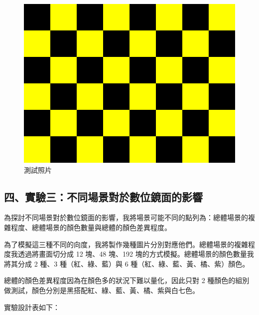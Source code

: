 \documentclass[12pt]{article}
\begin{document}
\begin{figure}[htbp]
\begin{minipage}[b]{0.3\textwidth}
    \centering
    \includegraphics[width=\textwidth]{img/blank_Yellow.png}
  \end{minipage}
  \caption{測試照片}\label{fig:test_img1}
\end{figure}

\newpage

\subsection{四、實驗三：不同場景對於數位鏡面的影響}

為探討不同場景對於數位鏡面的影響，我將場景可能不同的點列為：總體場景的複雜程度、總體場景的顏色數量與總體的顏色差異程度。

為了模擬這三種不同的向度，我將製作幾種圖片分別對應他們。總體場景的複雜程度我透過將畫面切分成 12 塊、48 塊、192 塊的方式模擬。總體場景的顏色數量我將其分成 2 種、3 種（紅、綠、藍）與 6 種（紅、綠、藍、黃、橘、紫）顏色。

總體的顏色差異程度因為在顏色多的狀況下難以量化，因此只對 2 種顏色的組別做測試，顏色分別是黑搭配紅、綠、藍、黃、橘、紫與白七色。

實驗設計表如下：
\end{document}
